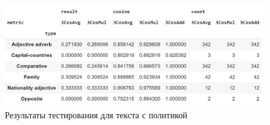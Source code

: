 \documentclass[a4paper,14pt]{article}
\begin{document}
\begin{figure}[H]
	\centering
	\includegraphics[width=0.7\linewidth]{image/politics}
	\caption{Результаты тестирования для текста с политикой}
	\label{fig:politics}
\end{figure}


	
\end{document}
